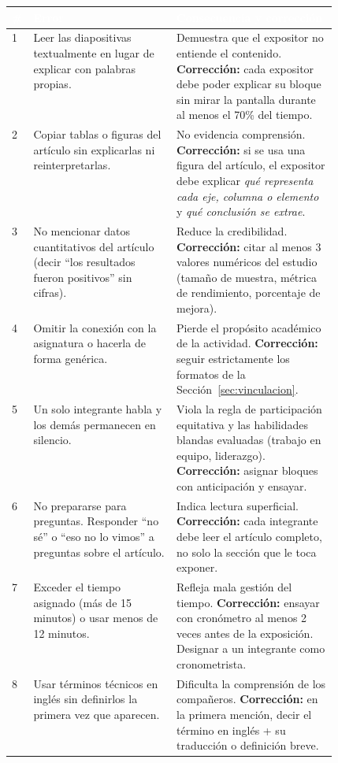 \documentclass[11pt,a4paper]{article}
\newcommand{\hdark}[1]{\cellcolor{darkblue}\textbf{\textcolor{white}{\small #1}}}
\begin{document}
	\noindent\begin{tabularx}{\linewidth}{|C{0.04\linewidth}|L{0.44\linewidth}|X|}
		\hline
		\hdark{\#} & \hdark{Error} & \hdark{Consecuencia y corrección}\\
		\hline
		\small 1 & \small \textcolor{alertred}{Leer las diapositivas textualmente} en lugar de explicar con palabras propias. & \small Demuestra que el expositor no entiende el contenido. \textbf{Corrección:} cada expositor debe poder explicar su bloque sin mirar la pantalla durante al menos el 70\% del tiempo.\\
		\hline
		\small 2 & \small \textcolor{alertred}{Copiar tablas o figuras del artículo} sin explicarlas ni reinterpretarlas. & \small No evidencia comprensión. \textbf{Corrección:} si se usa una figura del artículo, el expositor debe explicar \textit{qué representa cada eje, columna o elemento} y \textit{qué conclusión se extrae}.\\
		\hline
		\small 3 & \small \textcolor{alertred}{No mencionar datos cuantitativos} del artículo (decir ``los resultados fueron positivos'' sin cifras). & \small Reduce la credibilidad. \textbf{Corrección:} citar al menos 3 valores numéricos del estudio (tamaño de muestra, métrica de rendimiento, porcentaje de mejora).\\
		\hline
		\small 4 & \small \textcolor{alertred}{Omitir la conexión con la asignatura} o hacerla de forma genérica. & \small Pierde el propósito académico de la actividad. \textbf{Corrección:} seguir estrictamente los formatos de la Sección~\ref{sec:vinculacion}.\\
		\hline
		\small 5 & \small \textcolor{alertred}{Un solo integrante habla} y los demás permanecen en silencio. & \small Viola la regla de participación equitativa y las habilidades blandas evaluadas (trabajo en equipo, liderazgo). \textbf{Corrección:} asignar bloques con anticipación y ensayar.\\
		\hline
		\small 6 & \small \textcolor{alertred}{No prepararse para preguntas.} Responder ``no sé'' o ``eso no lo vimos'' a preguntas sobre el artículo. & \small Indica lectura superficial. \textbf{Corrección:} cada integrante debe leer el artículo completo, no solo la sección que le toca exponer.\\
		\hline
		\small 7 & \small \textcolor{alertred}{Exceder el tiempo} asignado (más de 15 minutos) o usar menos de 12 minutos. & \small Refleja mala gestión del tiempo. \textbf{Corrección:} ensayar con cronómetro al menos 2 veces antes de la exposición. Designar a un integrante como cronometrista.\\
		\hline
		\small 8 & \small \textcolor{alertred}{Usar términos técnicos en inglés sin definirlos} la primera vez que aparecen. & \small Dificulta la comprensión de los compañeros. \textbf{Corrección:} en la primera mención, decir el término en inglés + su traducción o definición breve.\\
		\hline
	\end{tabularx}
	
\end{document}
